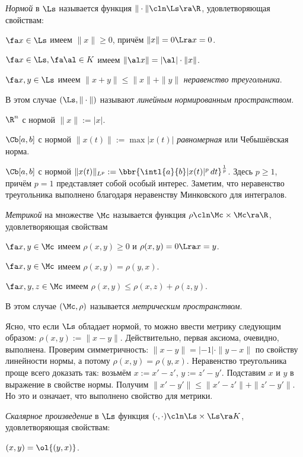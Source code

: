 \documentclass[a4paper]{article}
\newcommand{\intlab}{\intl{a}{b}}
\begin{document}
\emph{Нормой} в $\Ls$ называется функция $\|\cdot\|\cln\Ls\ra \R$, удовлетворяющая свойствам:

 $\fa x \in \Ls$ имеем $\|x\| \ge 0$, причём $\|x\|=0 \Lra x = 0$.

 $\fa x \in \Ls, \fa \al \in K$ имеем $\|\al x\|=|\al|\cdot\|x\|$.

 $\fa x,y\in \Ls$ имеем $\|x+y\| \le \|x\|+\|y\|$ \emph{неравенство треугольника}.

В этом случае $(\Ls, \|\cdot\|)$ называют \emph{линейным нормированным пространством}.

\begin{ex}
 $\R^n$ с нормой $\|x\|:= |x|$.

 $\Cb[a,b]$ с нормой $\|x(t)\| := \max |x(t)|$ \emph{равномерная} или Чебышёвская норма.

 $\Cb[a,b]$ с нормой $\|x(t)\|_{L^p} := \bbr{\intlab |x(t)|^p\,d t}^{\frac{1}{p}}$. Здесь $p
\ge 1$, причём $p = 1$ представляет собой особый интерес. Заметим, что неравенство треугольника
выполнено благодаря неравенству Минковского для интегралов.
\end{ex}

\emph{Метрикой} на множестве $\Mc$ называется функция $\rho\cln\Mc \times \Mc \ra \R$, удовлетворяющая свойствам

 $\fa x,y\in \Mc$ имеем $\rho(x,y) \ge 0$ и $\rho(x,y) = 0 \Lra x = y$.

 $\fa x,y \in \Mc$ имеем $\rho(x,y) = \rho(y,x)$.

 $\fa x,y,z \in \Mc$ имеем $\rho(x,y) \le \rho(x,z) + \rho(z,y)$.

В этом случае $(\Mc, \rho)$ называется \emph{метрическим пространством}.

Ясно, что если $\Ls$ обладает нормой, то можно ввести метрику следующим образом:
$\rho(x,y) := \|x - y\|$. Действительно, первая аксиома, очевидно, выполнена. Проверим
симметричность: $\|x-y\|=|-1|\cdot\|y-x\|$ по свойству линейности нормы,
а потому $\rho(x,y) = \rho(y,x)$. Неравенство треугольника проще всего доказать так:
возьмём $x := x' -z'$, $y := z'-y'$. Подставим $x$ и $y$ в выражение в свойстве 
нормы. Получим $\|x'-y'\| \le \|x'-z'\|+\|z'-y'\|$. Но это и означает, что выполнено свойство 
для метрики.

\emph{Скалярное произведение} в $\Ls$ функция $(\cdot,\cdot)\cln\Ls\times\Ls \ra K$, удовлетворяющая свойствам:

 $(x,y) = \ol{(y,x)}$.
\end{document}
